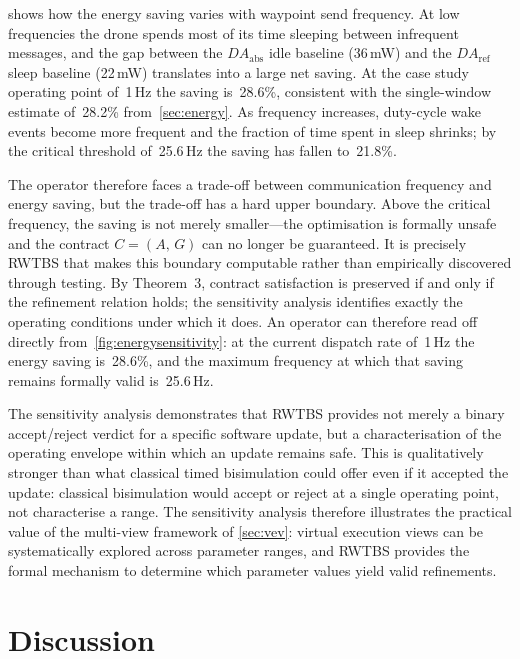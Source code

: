\documentclass[11pt,a4paper]{article}
\newcommand{\DAabs}{\mathit{DA}_{\mathrm{abs}}}
\newcommand{\DAref}{\mathit{DA}_{\mathrm{ref}}}
\newcommand{\RWTBS}{RWTBS}
\begin{document}
 shows how the energy saving varies with waypoint
send frequency.  At low frequencies the drone spends most of its time sleeping
between infrequent messages, and the gap between the $\DAabs$ idle baseline
(36\,mW) and the $\DAref$ sleep baseline (22\,mW) translates into a large net
saving.  At the case study operating point of~1\,Hz the saving is~28.6\%,
consistent with the single-window estimate of~28.2\% from~\cref{sec:energy}.
As frequency increases, duty-cycle wake events become more frequent and the
fraction of time spent in sleep shrinks; by the critical threshold of~25.6\,Hz
the saving has fallen to~21.8\%.

The operator therefore faces a trade-off between communication frequency and
energy saving, but the trade-off has a hard upper boundary.  Above the critical
frequency, the saving is not merely smaller---the optimisation is formally
unsafe and the contract $C = (A,\,G)$ can no longer be guaranteed.  It is
precisely \RWTBS{} that makes this boundary computable rather than empirically
discovered through testing.  By Theorem~3, contract satisfaction is preserved
if and only if the refinement relation holds; the sensitivity analysis
identifies exactly the operating conditions under which it does.  An operator
can therefore read off directly from~\cref{fig:energysensitivity}: at the
current dispatch rate of~1\,Hz the energy saving is~28.6\%, and the maximum
frequency at which that saving remains formally valid is~25.6\,Hz.

The sensitivity analysis demonstrates that \RWTBS{} provides not merely a
binary accept/reject verdict for a specific software update, but a
characterisation of the operating envelope within which an update remains safe.
This is qualitatively stronger than what classical timed bisimulation could
offer even if it accepted the update: classical bisimulation would accept or
reject at a single operating point, not characterise a range.  The sensitivity
analysis therefore illustrates the practical value of the multi-view framework
of \cref{sec:vev}: virtual execution views can be systematically explored
across parameter ranges, and \RWTBS{} provides the formal mechanism to
determine which parameter values yield valid refinements.

\section{Discussion}
\label{sec:discussion}
\end{document}
